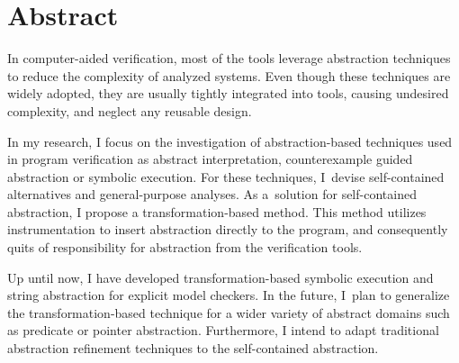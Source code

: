 \chapter*{Abstract}

In computer-aided verification, most of the tools leverage abstraction techniques to reduce the complexity of analyzed systems. Even though these techniques are widely adopted, they are usually tightly integrated into tools, causing undesired complexity, and neglect any reusable design.

In my research, I focus on the investigation of abstraction-based techniques used in program verification as abstract interpretation, counterexample guided abstraction or symbolic execution. For these techniques, I~devise self-contained alternatives and general-purpose analyses. As a~solution for self-contained abstraction, I propose a transformation-based method.
This method utilizes instrumentation to insert abstraction directly to the program, and consequently quits of responsibility for abstraction from the verification tools.

Up until now, I have developed transformation-based symbolic execution and string abstraction for explicit model checkers. In the future, I~plan to generalize the transformation-based technique for a wider variety of abstract domains such as predicate or pointer abstraction. Furthermore, I intend to adapt traditional abstraction refinement techniques to the self-contained abstraction.
